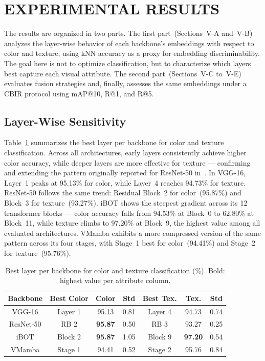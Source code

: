 \documentclass[letterpaper, 10 pt, conference]{ieeeconf}
\begin{document}
\section{EXPERIMENTAL RESULTS}

The results are organized in two parts.
The first part~(Sections~V-A and~V-B) analyzes the layer-wise behavior
of each backbone's embeddings with respect to color and texture, using
kNN accuracy as a proxy for embedding discriminability.
The goal here is not to optimize classification, but to characterize
which layers best capture each visual attribute.
The second part~(Sections~V-C to~V-E) evaluates fusion strategies and,
finally, assesses the same embeddings under a CBIR protocol using
mAP@10, R@1, and R@5.

\subsection{Layer-Wise Sensitivity}

Table~\ref{tab_best_layer} summarizes the best layer per backbone for
color and texture classification.
Across all architectures, early layers consistently achieve higher color
accuracy, while deeper layers are more effective for texture — confirming
and extending the pattern originally reported for ResNet-50
in~\cite{b2}.
In VGG-16, Layer~1 peaks at 95.13\% for color, while Layer~4 reaches
94.73\% for texture.
ResNet-50 follows the same trend: Residual Block~2 for color~(95.87\%)
and Block~3 for texture~(93.27\%).
iBOT shows the steepest gradient across its 12 transformer blocks —
color accuracy falls from 94.53\% at Block~0 to 62.80\% at Block~11,
while texture climbs to 97.20\% at Block~9, the highest value among all
evaluated architectures.
VMamba exhibits a more compressed version of the same pattern across its
four stages, with Stage~1 best for color~(94.41\%) and Stage~2 for
texture~(95.76\%).

\begin{table}[htbp]
\caption{Best layer per backbone for color and texture classification
         (\%). Bold: highest value per attribute column.}
\begin{center}
\begin{tabular}{c|c|c|c|c|c|c}
\hline
\textbf{Backbone} & \textbf{Best Color} & \textbf{Color} & \textbf{Std}
                  & \textbf{Best Tex.}  & \textbf{Tex.}  & \textbf{Std} \\
\hline
VGG-16    & Layer 1 & 95.13          & 0.81 & Layer 4 & 94.73          & 0.74 \\
ResNet-50 & RB 2    & \textbf{95.87} & 0.50 & RB 3    & 93.27          & 0.25 \\
iBOT      & Block 2 & \textbf{95.87} & 1.05 & Block 9 & \textbf{97.20} & 0.54 \\
VMamba    & Stage 1 & 94.41          & 0.52 & Stage 2 & 95.76          & 0.84 \\
\hline
\end{tabular}
\label{tab_best_layer}
\end{center}
\end{table}
\end{document}
